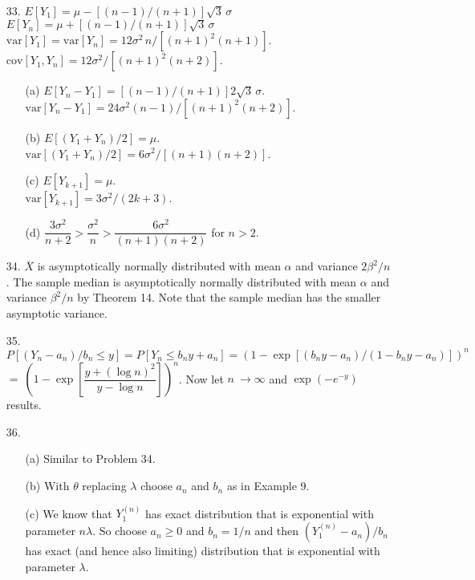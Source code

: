 \begin{enumerate}
	\item[33.] $E[Y_1] = \mu - [(n-1)/(n+1)]\sqrt{3}\, \sigma$ \\
	$E[Y_n] = \mu + [(n-1)/(n+1)]\sqrt{3}\, \sigma$ \\
	$\mbox{var}[Y_1] = \mbox{var}[Y_n] = 12\sigma^2\, n/[(n+1)^2(n+1)]$. \\
	$\mbox{cov}[Y_1,Y_n] = 12\sigma^2/[(n+1)^2(n+2)]$.

	\newpage
	
	\begin{enumerate}
		\item[(a)] $E[Y_n - Y_1] = [(n-1)/(n+1)]2\sqrt{3}\, \sigma$. \\
			$\mbox{var}[Y_n-Y_1] = 24\sigma^2(n-1)/[(n+1)^2(n+2)]$. 
		\item[(b)] $E[(Y_1+Y_n)/2] = \mu.$ \\
			$\mbox{var}[(Y_1+Y_n)/2] = 6\sigma^2/[(n+1)(n+2)]$.
		\item[(c)] $E[Y_{k+1}] = \mu$. \\
			$\mbox{var}[Y_{k+1}] = 3\sigma^2/(2k+3)$. 
		\item[(d)] $\dfrac{3\sigma^2}{n+2} > \dfrac{\sigma^2}{n} > \dfrac{6\sigma^2}{(n+1)(n+2)}$ for $n > 2$.
	\end{enumerate}
	
	\item[34.] $\overline{X}$ is asymptotically normally distributed with mean $\alpha$ and variance $2\beta^2/n$. The sample median is asymptotically normally distributed with mean $\alpha$ and variance $\beta^2/n$ by Theorem 14. Note that the sample median has the smaller asymptotic variance. 

	\item[35.] $P[(Y_n-a_n)/b_n \le y] = P[Y_n \le b_ny + a_n] = (1 - \exp[(b_ny-a_n)/(1-b_ny-a_n)])^n$ \\
	$=\ (1 - \exp[\dfrac{y+(\log n)^2}{y-\log n}])^n$. Now let $n\ \to \infty$ and $\exp(-e^{-y})$ results.

	\item[36.] \begin{enumerate}
		\item[(a)] Similar to Problem 34.
		\item[(b)] With $\theta$ replacing $\lambda$ choose $a_n$ and $b_n$ as in Example 9.
		\item[(c)] We know that $Y_1^{(n)}$ has exact distribution that is exponential with parameter $n\lambda$. So choose $a_n \ge 0$ and $b_n= 1/n$ and then $(Y_1^{(n)} - a_n)/b_n$ has exact (and hence also limiting) distribution that is exponential with parameter $\lambda$.
 	\end{enumerate}

\end{enumerate}